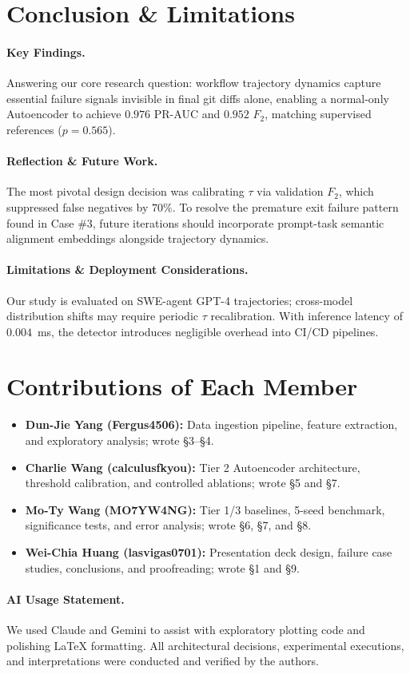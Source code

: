 \documentclass[11pt]{article}
\begin{document}
\section{Conclusion \& Limitations}\label{sec:conclusion}
\paragraph{Key Findings.}
Answering our core research question: workflow trajectory dynamics capture essential failure signals invisible in final git diffs alone, enabling a normal-only Autoencoder to achieve $0.976$ PR-AUC and $0.952$ $F_2$, matching supervised references ($p=0.565$).

\paragraph{Reflection \& Future Work.}
The most pivotal design decision was calibrating $\tau$ via validation $F_2$, which suppressed false negatives by $70\%$. To resolve the premature exit failure pattern found in Case \#3, future iterations should incorporate prompt-task semantic alignment embeddings alongside trajectory dynamics.

\paragraph{Limitations \& Deployment Considerations.}
Our study is evaluated on SWE-agent GPT-4 trajectories; cross-model distribution shifts may require periodic $\tau$ recalibration. With inference latency of $0.004$~ms, the detector introduces negligible overhead into CI/CD pipelines.

\section*{Contributions of Each Member}
\begin{itemize}
    \item \textbf{Dun-Jie Yang (Fergus4506):} Data ingestion pipeline, feature extraction, and exploratory analysis; wrote \S3--\S4.
    \item \textbf{Charlie Wang (calculusfkyou):} Tier 2 Autoencoder architecture, threshold calibration, and controlled ablations; wrote \S5 and \S7.
    \item \textbf{Mo-Ty Wang (MO7YW4NG):} Tier 1/3 baselines, 5-seed benchmark, significance tests, and error analysis; wrote \S6, \S7, and \S8.
    \item \textbf{Wei-Chia Huang (lasvigas0701):} Presentation deck design, failure case studies, conclusions, and proofreading; wrote \S1 and \S9.
\end{itemize}

\paragraph{AI Usage Statement.}
We used Claude and Gemini to assist with exploratory plotting code and polishing LaTeX formatting. All architectural decisions, experimental executions, and interpretations were conducted and verified by the authors.


\end{document}
